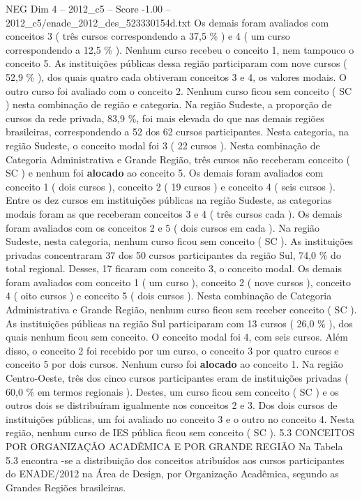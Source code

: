 \begin{textsample}{NEG Dim 4 – 2012\_c5 – Score -1.00 – 2012\_c5/enade\_2012\_des\_523330154d.txt}
Os demais foram avaliados com conceitos 3 ( três cursos correspondendo a 37,5 \% ) e 4 ( um curso correspondendo a 12,5 \% ).
Nenhum curso recebeu o conceito 1, nem tampouco o conceito 5.
As instituições públicas dessa região participaram com nove cursos ( 52,9 \% ), dos quais quatro cada obtiveram conceitos 3 e 4, os valores modais.
O outro curso foi avaliado com o conceito 2.
Nenhum curso ficou sem conceito ( SC ) nesta combinação de região e categoria.
Na região Sudeste, a proporção de cursos da rede privada, 83,9 \%, foi mais elevada do que nas demais regiões brasileiras, correspondendo a 52 dos 62 cursos participantes.
Nesta categoria, na região Sudeste, o conceito modal foi 3 ( 22 cursos ).
Nesta combinação de Categoria Administrativa e Grande Região, três cursos não receberam conceito ( SC ) e nenhum foi \textbf{alocado} ao conceito 5.
Os demais foram avaliados com conceito 1 ( dois cursos ), conceito 2 ( 19 cursos ) e conceito 4 ( seis cursos ).
Entre os dez cursos em instituições públicas na região Sudeste, as categorias modais foram as que receberam conceitos 3 e 4 ( três cursos cada ).
Os demais foram avaliados com os conceitos 2 e 5 ( dois cursos em cada ).
Na região Sudeste, nesta categoria, nenhum curso ficou sem conceito ( SC ).
As instituições privadas concentraram 37 dos 50 cursos participantes da região Sul, 74,0 \% do total regional.
Desses, 17 ficaram com conceito 3, o conceito modal.
Os demais foram avaliados com conceito 1 ( um curso ), conceito 2 ( nove cursos ), conceito 4 ( oito cursos ) e conceito 5 ( dois cursos ).
Nesta combinação de Categoria Administrativa e Grande Região, nenhum curso ficou sem receber conceito ( SC ).
As instituições públicas na região Sul participaram com 13 cursos ( 26,0 \% ), dos quais nenhum ficou sem conceito.
O conceito modal foi 4, com seis cursos.
Além disso, o conceito 2 foi recebido por um curso, o conceito 3 por quatro cursos e conceito 5 por dois cursos.
Nenhum curso foi \textbf{alocado} ao conceito 1.
Na região Centro-Oeste, três dos cinco cursos participantes eram de instituições privadas ( 60,0 \% em termos regionais ).
Destes, um curso ficou sem conceito ( SC ) e os outros dois se distribuíram igualmente nos conceitos 2 e 3.
Dos dois cursos de instituições públicas, um foi avaliado no conceito 3 e o outro no conceito 4.
Nesta região, nenhum curso de IES pública ficou sem conceito ( SC ). 5.3 CONCEITOS POR ORGANIZAÇÃO ACADÊMICA E POR GRANDE REGIÃO Na Tabela 5.3 encontra -se a distribuição dos conceitos atribuídos aos cursos participantes do ENADE/2012 na Área de Design, por Organização Acadêmica, segundo as Grandes Regiões brasileiras.

\end{textsample}
